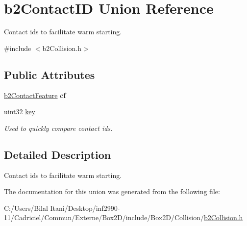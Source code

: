 \hypertarget{unionb2_contact_i_d}{}\section{b2\+Contact\+ID Union Reference}
\label{unionb2_contact_i_d}


Contact ids to facilitate warm starting.  




{\ttfamily \#include $<$b2\+Collision.\+h$>$}

\subsection*{Public Attributes}
\begin{DoxyCompactItemize}
\item 
\hyperlink{structb2_contact_feature}{b2\+Contact\+Feature} {\bfseries cf}\hypertarget{unionb2_contact_i_d_a58b6732f909bc760f75e7aff3cd4be08}{}\label{unionb2_contact_i_d_a58b6732f909bc760f75e7aff3cd4be08}

\item 
uint32 \hyperlink{unionb2_contact_i_d_a04c04f8fdcb799b33552d01b3aa3f245}{key}\hypertarget{unionb2_contact_i_d_a04c04f8fdcb799b33552d01b3aa3f245}{}\label{unionb2_contact_i_d_a04c04f8fdcb799b33552d01b3aa3f245}

\begin{DoxyCompactList}\small\item\em Used to quickly compare contact ids. \end{DoxyCompactList}\end{DoxyCompactItemize}


\subsection{Detailed Description}
Contact ids to facilitate warm starting. 

The documentation for this union was generated from the following file\+:\begin{DoxyCompactItemize}
\item 
C\+:/\+Users/\+Bilal Itani/\+Desktop/inf2990-\/11/\+Cadriciel/\+Commun/\+Externe/\+Box2\+D/include/\+Box2\+D/\+Collision/\hyperlink{b2_collision_8h}{b2\+Collision.\+h}\end{DoxyCompactItemize}
